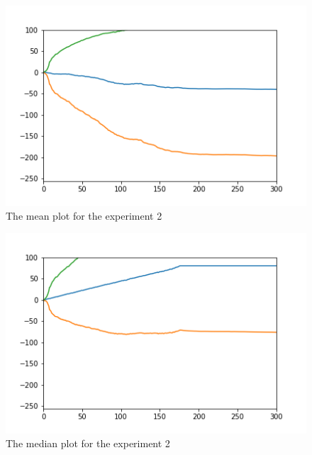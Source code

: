 \documentclass{article}
\begin{document}
\begin{figure}
\includegraphics[]{plot4.png}
\caption{The mean plot for the experiment 2}
\end{figure}
\begin{figure}
\includegraphics[]{plot5.png}
\caption{The median plot for the experiment 2}
\end{figure}
\end{document}
